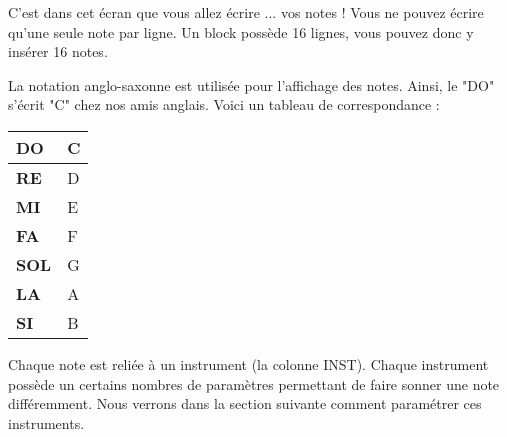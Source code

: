 C'est dans cet écran que vous allez écrire ... vos notes !
Vous ne pouvez écrire qu'une seule note par ligne.
Un block possède 16 lignes, vous pouvez donc y insérer 16 notes.
\medskip

La notation anglo-saxonne est utilisée pour l'affichage des notes.
Ainsi, le "DO" s'écrit "C" chez nos amis anglais.
Voici un tableau de correspondance :
\medskip

\begin{center}
    \tablelasttail{\hline}
    \begin{supertabular}{|l|l|}
    \hline
        {\bf DO} & C \\
        \hline
        {\bf RE} & D \\
        \hline
        {\bf MI} & E \\
        \hline
        {\bf FA} & F \\
        \hline
        {\bf SOL} & G \\
        \hline
        {\bf LA} & A \\
        \hline
        {\bf SI} & B \\
    \hline
    \end{supertabular}
\end{center}


Chaque note est reliée à un instrument (la colonne INST).
Chaque instrument possède un certains nombres de paramètres permettant de faire sonner une note différemment.
Nous verrons dans la section suivante comment paramétrer ces instruments.


